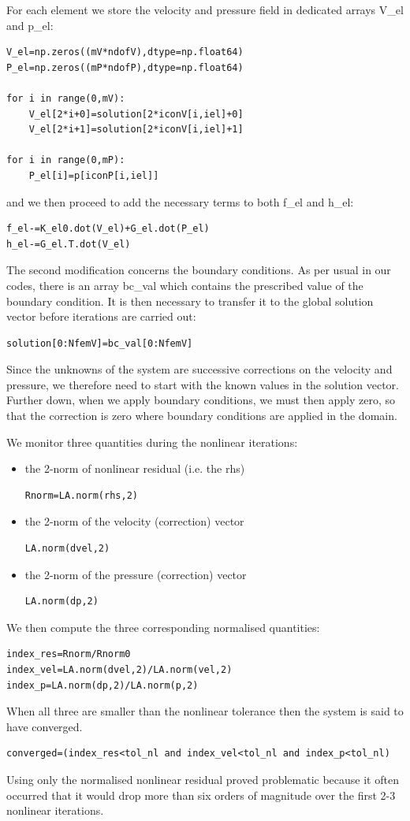 For each element we store the velocity and pressure field in dedicated arrays
{\python V\_el} and {\python p\_el}:

\begin{lstlisting}
V_el=np.zeros((mV*ndofV),dtype=np.float64)
P_el=np.zeros((mP*ndofP),dtype=np.float64)

for i in range(0,mV):
    V_el[2*i+0]=solution[2*iconV[i,iel]+0]
    V_el[2*i+1]=solution[2*iconV[i,iel]+1]

for i in range(0,mP):
    P_el[i]=p[iconP[i,iel]]
\end{lstlisting}
and we then proceed to add the necessary terms to both {\python f\_el} and {\python h\_el}:
\begin{lstlisting}
f_el-=K_el0.dot(V_el)+G_el.dot(P_el) 
h_el-=G_el.T.dot(V_el)               
\end{lstlisting}

The second modification concerns the boundary conditions. 
As per usual in our codes, there is an array {\python bc\_val} 
which contains the prescribed value of the boundary condition.
It is then necessary to transfer it to the global solution vector 
before iterations are carried out:
\begin{lstlisting}
solution[0:NfemV]=bc_val[0:NfemV]
\end{lstlisting}
Since the unknowns of the system are successive corrections on the 
velocity and pressure, we therefore need to start with the known 
values in the solution vector. Further down, when we apply boundary conditions, 
we must then apply zero, so that the correction is zero where 
boundary conditions are applied in the domain.  

We monitor three quantities during the nonlinear iterations:
\begin{itemize}
\item the 2-norm of nonlinear residual (i.e. the rhs)
\begin{lstlisting}
Rnorm=LA.norm(rhs,2) 
\end{lstlisting}
\item the 2-norm of the velocity (correction) vector
\begin{lstlisting}
LA.norm(dvel,2)
\end{lstlisting}
\item the 2-norm of the pressure (correction) vector
\begin{lstlisting}
LA.norm(dp,2)
\end{lstlisting}
\end{itemize}
We then compute the three corresponding normalised quantities:
\begin{lstlisting}
index_res=Rnorm/Rnorm0
index_vel=LA.norm(dvel,2)/LA.norm(vel,2)
index_p=LA.norm(dp,2)/LA.norm(p,2)
\end{lstlisting}
When all three are smaller than the nonlinear tolerance then the system is said to have converged. 
\begin{lstlisting}
converged=(index_res<tol_nl and index_vel<tol_nl and index_p<tol_nl)
\end{lstlisting}
Using only the normalised nonlinear residual proved problematic because it often occurred that it would drop 
more than six orders of magnitude over the first 2-3 nonlinear iterations. 

